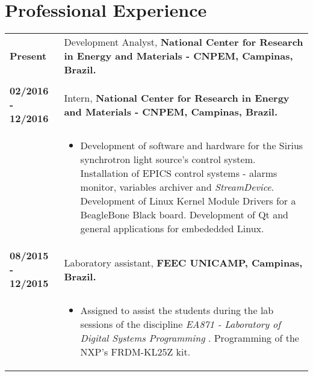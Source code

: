 \documentclass[10pt, a4paper]{article}
\begin{document}
\section{Professional Experience}

\begin{tabular}{p{} p{}}

\textbf{Present}  & Development Analyst, \textbf{National Center for Research in
Energy and Materials - CNPEM, Campinas, Brazil.}
\\
& \vspace{-12pt}
\\

\textbf{02/2016 - 12/2016}  & Intern, \textbf{National Center for Research in
Energy and Materials - CNPEM, Campinas, Brazil.}
 \\
  & \vspace{-12pt}
  \begin{itemize}
    \item Development of software and hardware for the Sirius synchrotron light
    source's control system. Installation of EPICS
    control systems - alarms monitor, variables archiver and \textit{StreamDevice}.
    Development of Linux Kernel Module Drivers for a BeagleBone Black board.
    Development of Qt and general applications for
    embededded Linux.
    
	\end{itemize}\\

\textbf{08/2015 - 12/2015}  & Laboratory assistant, \textbf{FEEC
 UNICAMP, Campinas, Brazil.}
 \\
  & \vspace{-12pt}
  \begin{itemize}
    \item Assigned to assist the students during the lab sessions of the
    discipline \textit{EA871 - Laboratory of Digital Systems Programming
    }. Programming of the NXP's FRDM-KL25Z kit.
        
	\end{itemize}\\




\end{tabular}
\end{document}

